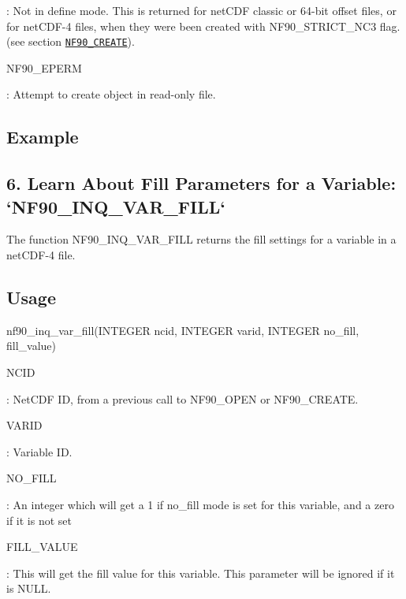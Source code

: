 \+: Not in define mode. This is returned for net\+C\+DF classic or 64-\/bit offset files, or for net\+C\+D\+F-\/4 files, when they were been created with N\+F90\+\_\+\+S\+T\+R\+I\+C\+T\+\_\+\+N\+C3 flag. (see section \href{#NF90_005fCREATE}{\tt N\+F90\+\_\+\+C\+R\+E\+A\+TE}).

{\ttfamily N\+F90\+\_\+\+E\+P\+E\+RM}

\+: Attempt to create object in read-\/only file.

\subsection*{Example}\hypertarget{f90-variables_f90-learn-about-fill-parameters-for-a-variable-nf90_inq_var_fill}{}\subsection{6. Learn About Fill Parameters for a Variable\+: `\+N\+F90\+\_\+\+I\+N\+Q\+\_\+\+V\+A\+R\+\_\+\+F\+I\+L\+L` }\label{f90-variables_f90-learn-about-fill-parameters-for-a-variable-nf90_inq_var_fill}
The function N\+F90\+\_\+\+I\+N\+Q\+\_\+\+V\+A\+R\+\_\+\+F\+I\+LL returns the fill settings for a variable in a net\+C\+D\+F-\/4 file.

\subsection*{Usage}


\begin{DoxyCode}
nf90\_inq\_var\_fill(\textcolor{keywordtype}{INTEGER} ncid, \textcolor{keywordtype}{INTEGER} varid, \textcolor{keywordtype}{INTEGER} no\_fill, fill\_value)
\end{DoxyCode}


{\ttfamily N\+C\+ID}

\+: Net\+C\+DF ID, from a previous call to N\+F90\+\_\+\+O\+P\+EN or N\+F90\+\_\+\+C\+R\+E\+A\+TE.

{\ttfamily V\+A\+R\+ID}

\+: Variable ID.

{\ttfamily N\+O\+\_\+\+F\+I\+LL}

\+: An integer which will get a 1 if no\+\_\+fill mode is set for this variable, and a zero if it is not set

{\ttfamily F\+I\+L\+L\+\_\+\+V\+A\+L\+UE}

\+: This will get the fill value for this variable. This parameter will be ignored if it is N\+U\+LL.


